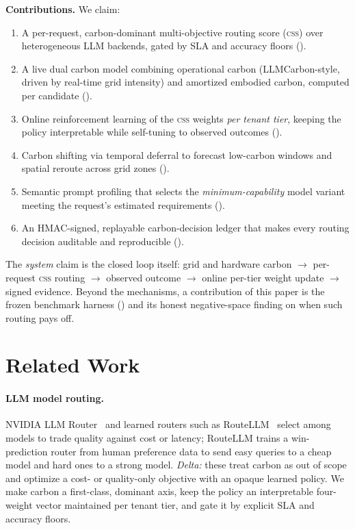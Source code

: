 \documentclass[10pt,twocolumn]{article}
\newcommand{\css}{\textsc{css}}
\begin{document}
\medskip
\noindent\textbf{Contributions.} We claim:
\begin{enumerate}
  \item[\textbf{M1}] A per-request, carbon-dominant multi-objective routing
        score (\css) over heterogeneous LLM backends, gated by SLA and
        accuracy floors ().
  \item[\textbf{M2}] A live dual carbon model combining operational carbon
        (LLMCarbon-style, driven by real-time grid intensity) and amortized
        embodied carbon, computed per candidate ().
  \item[\textbf{M3}] Online reinforcement learning of the \css{} weights
        \emph{per tenant tier}, keeping the policy interpretable while
        self-tuning to observed outcomes ().
  \item[\textbf{M4}] Carbon shifting via temporal deferral to forecast
        low-carbon windows and spatial reroute across grid zones
        ().
  \item[\textbf{M5}] Semantic prompt profiling that selects the
        \emph{minimum-capability} model variant meeting the request's
        estimated requirements ().
  \item[\textbf{M6}] An HMAC-signed, replayable carbon-decision ledger that
        makes every routing decision auditable and reproducible
        ().
\end{enumerate}
The \emph{system} claim is the closed loop itself: grid and hardware carbon
$\to$ per-request \css{} routing $\to$ observed outcome $\to$ online per-tier
weight update $\to$ signed evidence. Beyond the mechanisms, a contribution of
this paper is the frozen benchmark harness () and its honest
negative-space finding on when such routing pays off.

\section{Related Work}
\label{sec:related}

\paragraph{LLM model routing.}
NVIDIA LLM Router~\cite{nvidia-llm-router} and learned routers such as
RouteLLM~\cite{routellm} select among models to trade quality against cost or
latency; RouteLLM trains a win-prediction router from human preference data to
send easy queries to a cheap model and hard ones to a strong model.
\emph{Delta:} these treat carbon as out of scope and optimize a cost- or
quality-only objective with an opaque learned policy. We make carbon a
first-class, dominant axis, keep the policy an interpretable four-weight vector
maintained per tenant tier, and gate it by explicit SLA and accuracy floors.
\end{document}

